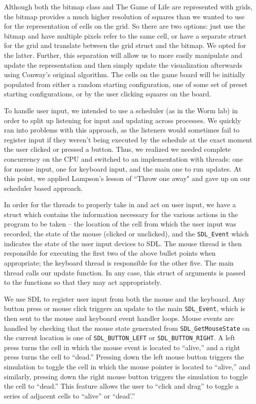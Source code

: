 \documentclass[onecolumn,12pt]{IEEEtran}
\begin{document}
  Although both the bitmap class and The Game of Life are represented with grids,
  the bitmap provides a much higher resolution of squares than we wanted to use
  for the representation of cells on the grid. So there are two options: just use
  the bitmap and have multiple pixels refer to the same cell, or have a separate
  struct for the grid and translate between the grid struct and the bitmap. We
  opted for the latter. Further, this separation will allow us to more easily
  manipulate and update the representation and then simply update the
  visualization afterwards using Conway's original algorithm. The cells on the
  game board will be initially populated from either a random starting
  configuration, one of some set of preset starting configurations, or by the
  user clicking squares on the board. 

  To handle user input, we intended to use a scheduler (as in the Worm lab) in
  order to split up listening for input and updating across processes. We quickly
  ran into problems with this approach, as the listeners would sometimes fail to
  register input if they weren't being executed by the schedule at the exact
  moment the user clicked or pressed a button. Thus, we realized we needed
  complete concurrency on the CPU and switched to an implementation with threads:
  one for mouse input, one for keyboard input, and the main one to run updates.
  At this point, we applied Lampson's lesson of ``Throw one away" and gave up on
  our scheduler based approach.

  In order for the threads to properly take in and act on user input, we have a
  struct which contains the information necessary for the various actions in the
  program to be taken -- the location of the cell from which the user input was
  recorded, the state of the mouse (clicked or unclicked), and the
  \texttt{SDL\_Event} which indicates the state of the user input devices to SDL.
  The mouse thread is then responsible for executing the first two of the above
  bullet points when appropriate; the keyboard thread is responsible for the
  other five. The main thread calls our update function. In any case, this struct
  of arguments is passed to the functions so that they may act appropriately. 

  We use SDL to register user input from both the mouse and the keyboard. Any
  button press or mouse click triggers an update to the main \texttt{SDL\_Event},
  which is then sent to the mouse and keyboard event handler loops. Mouse events
  are handled by checking that the mouse state generated from
  \texttt{SDL\_GetMouseState} on the current location is one of
  \texttt{SDL\_BUTTON\_LEFT} or \texttt{SDL\_BUTTON\_RIGHT}. A left press turns
  the cell in which the mouse event is located to ``alive,'' and a right press
  turns the cell to ``dead.'' Pressing down the left mouse button triggers the
  simulation to toggle the cell in which the mouse pointer is located to
  ``alive,'' and similarly, pressing down the right mouse button triggers the
  simulation to toggle the cell to ``dead.'' This feature allows the user to
  ``click and drag'' to toggle a series of adjacent cells to ``alive'' or
  ``dead'.''
\end{document}

